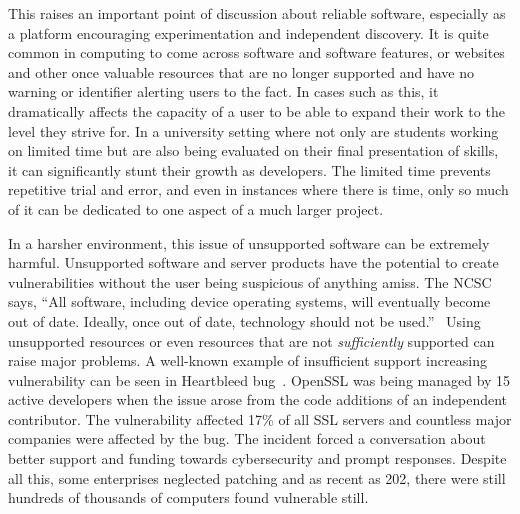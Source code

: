 \documentclass[]{final_report}
\begin{document}
This raises an important point of discussion about reliable software, especially as a platform encouraging experimentation and independent discovery. It is quite common in computing to come across software and software features, or websites and other once valuable resources that are no longer supported and have no warning or identifier alerting users to the fact. In cases such as this, it dramatically affects the capacity of a user to be able to expand their work to the level they strive for. In a university setting where not only are students working on limited time but are also being evaluated on their final presentation of skills, it can significantly stunt their growth as developers. The limited time prevents repetitive trial and error, and even in instances where there is time, only so much of it can be dedicated to one aspect of a much larger project.

In a harsher environment, this issue of unsupported software can be extremely harmful. Unsupported software and server products have the potential to create vulnerabilities without the user being suspicious of anything amiss. The NCSC says, “All software, including device operating systems, will eventually become out of date. Ideally, once out of date, technology should not be used.”~\cite{SEC} Using unsupported resources or even resources that are not \emph{sufficiently} supported can raise major problems. A well-known example of insufficient support increasing vulnerability can be seen in Heartbleed bug~\cite{HEART}. OpenSSL was being managed by 15 active developers when the issue arose from the code additions of an independent contributor. The vulnerability affected 17\% of all SSL servers and countless major companies were affected by the bug. The incident forced a conversation about better support and funding towards cybersecurity and prompt responses. Despite all this, some enterprises neglected patching and as recent as 202, there were still hundreds of thousands of computers found vulnerable still. 


\end{document}
